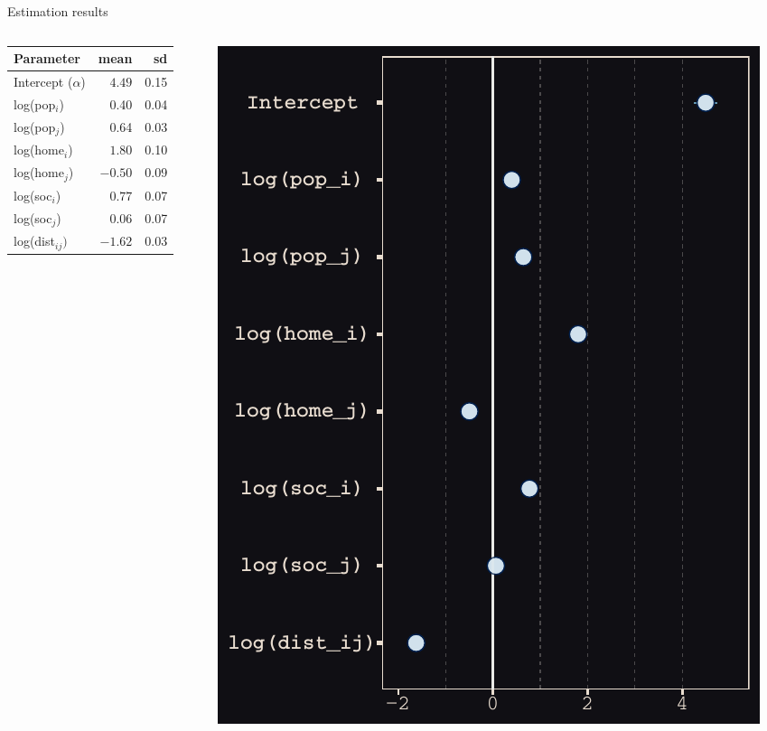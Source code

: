 \documentclass{beamer}
\begin{document}
\begin{frame}{Estimation results}
		\begin{columns}
		\begin{column}{0.5\textwidth}
			\begin{center}
				\begin{small}
			  \begin{tabular}{lrr}
				\toprule
				Parameter & mean & sd \\ 
				\midrule
				Intercept ($\alpha$)      & $4.49$ & 0.15 \\
				log(pop$_i$)   & 0.40 & 0.04  \\
				log(pop$_j$)   & 0.64 & 0.03  \\
				log(home$_i$)  & $1.80$ & 0.10 \\
				log(home$_j$)  & $-0.50$ & 0.09 \\
				log(soc$_i$)   & $0.77$ & 0.07 \\
				log(soc$_j$)   & $0.06$ & 0.07 \\
				log(dist$_{ij})$ & $-1.62$ & 0.03  \\
				\bottomrule
			\end{tabular}
		\end{small}
		\end{center}
		\end{column}
		\begin{column}{0.5\textwidth} 

			\begin{center}
				\includegraphics[width=\textwidth]{../../fig/forestplot}      
			\end{center}
		\end{column}
	\end{columns}
\end{frame}
\end{document}
